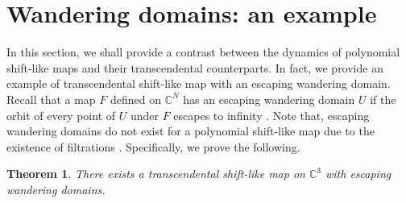 \documentclass[12pt, reqno]{amsart}
\numberwithin{equation}{section}
\theoremstyle{definition}
\theoremstyle{remark}
\theoremstyle{plain}
\newtheorem{theorem}{Theorem}[section]
\theoremstyle{definition}
\numberwithin{equation}{section}
\begin{document}
\section{Wandering domains: an example}
In this section, we shall provide a contrast between the dynamics of polynomial shift-like maps and their transcendental counterparts. In fact, we provide an example of transcendental shift-like map with an escaping wandering domain. Recall that a map $F$ defined on $\mathbb{C}^N$ has an escaping wandering domain $U$ if the orbit of every point of $U$ under $F$ escapes to infinity \cite{Arosio}. Note that, escaping wandering domains do not exist for a polynomial shift-like map due to the existence of filtrations \cite{Bedford}. Specifically, we prove the following. 
\begin{theorem}
There exists a transcendental shift-like map on $\mathbb{C}^3$ with escaping wandering domains.
\end{theorem}
\end{document}
